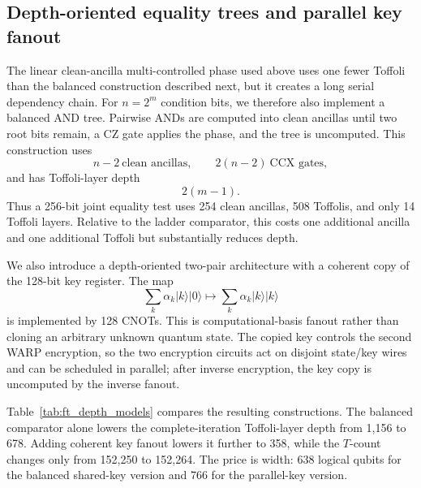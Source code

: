 \documentclass[pdflatex,sn-nature]{sn-jnl}
\providecommand{\ket}[1]{\lvert #1\rangle}
\theoremstyle{thmstyleone}
\theoremstyle{thmstyletwo}
\begin{document}
\subsection{Depth-oriented equality trees and parallel key fanout}
\label{subsec:depth_oracle}
The linear clean-ancilla multi-controlled phase used above uses one fewer Toffoli than the balanced construction described next, but it creates a long serial dependency chain. For $n=2^m$ condition bits, we therefore also implement a balanced AND tree. Pairwise ANDs are computed into clean ancillas until two root bits remain, a CZ gate applies the phase, and the tree is uncomputed. This construction uses
\begin{equation}
    n-2\ \text{clean ancillas},\qquad 2(n-2)\ \text{CCX gates},
\end{equation}
and has Toffoli-layer depth
\begin{equation}
    2(m-1).
\end{equation}
Thus a 256-bit joint equality test uses 254 clean ancillas, 508 Toffolis, and only 14 Toffoli layers. Relative to the ladder comparator, this costs one additional ancilla and one additional Toffoli but substantially reduces depth.

We also introduce a depth-oriented two-pair architecture with a coherent copy of the 128-bit key register. The map
\begin{equation}
    \sum_k \alpha_k\ket{k}\ket{0}\longmapsto
    \sum_k \alpha_k\ket{k}\ket{k}
\end{equation}
is implemented by 128 CNOTs. This is computational-basis fanout rather than cloning an arbitrary unknown quantum state. The copied key controls the second WARP encryption, so the two encryption circuits act on disjoint state/key wires and can be scheduled in parallel; after inverse encryption, the key copy is uncomputed by the inverse fanout.

Table~\ref{tab:ft_depth_models} compares the resulting constructions. The balanced comparator alone lowers the complete-iteration Toffoli-layer depth from 1,156 to 678. Adding coherent key fanout lowers it further to 358, while the $T$-count changes only from 152,250 to 152,264. The price is width: 638 logical qubits for the balanced shared-key version and 766 for the parallel-key version.
\end{document}

